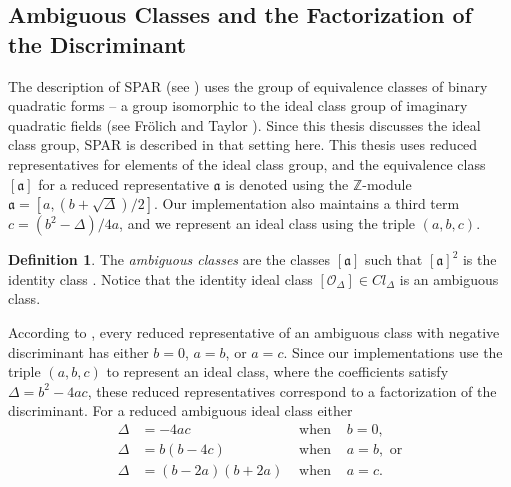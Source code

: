 \documentclass{ucalgthes1}
\theoremstyle{definition}
\newtheorem{defn}[thm]{Definition}
\newcommand{\ZZ}{\mathbb{Z}}
\begin{document}
\subsection{Ambiguous Classes and the Factorization of the Discriminant}
\label{subsec:forms}


The description of SPAR (see \cite{Schnorr1984}) uses the group of equivalence classes of binary quadratic forms -- a group isomorphic to the ideal class group of imaginary quadratic fields (see Fr{\"o}lich and Taylor \cite{Frolich1993}).  Since this thesis discusses the ideal class group, SPAR is described in that setting here.  This thesis uses reduced representatives for elements of the ideal class group, and the equivalence class $[\mathfrak a]$ for a reduced representative $\mathfrak a$ is denoted using the $\ZZ$\mbox{-}module $\mathfrak a = [a, (b + \sqrt\Delta)/2]$.  Our implementation also maintains a third term $c = (b^2 - \Delta)/4a$, and we represent an ideal class using the triple $(a, b, c)$.

\begin{defn}
The \emph{ambiguous classes} are the classes $[\mathfrak a]$ such that ${[\mathfrak a]}^2$ is the identity class \cite[p.302]{Schnorr1984}.  Notice that the identity ideal class $[\mathcal O_\Delta] \in Cl_\Delta$ is an ambiguous class.
\end{defn}

According to \cite[p.303]{Schnorr1984}, every reduced representative of an ambiguous class with negative discriminant has either $b = 0$, $a = b$, or $a = c$.  Since our implementations use the triple $(a, b, c)$ to represent an ideal class, where the coefficients satisfy $\Delta = b^2 - 4ac$, these reduced representatives correspond to a factorization of the discriminant.  For a reduced ambiguous ideal class either
\begin{align*}
	\Delta &= -4ac & \textrm{ when } & b = 0, \\
	\Delta &= b(b-4c) & \textrm{ when } & a = b, \textrm{ or} \\
	\Delta &= (b - 2a)(b + 2a) & \textrm{ when } & a = c.
\end{align*}
\end{document}
